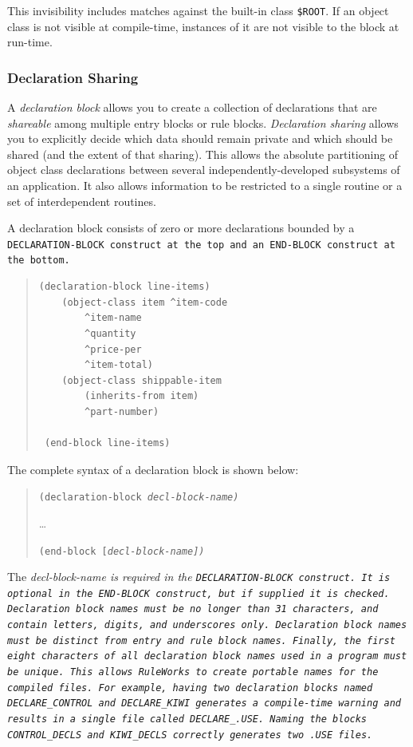This invisibility includes matches against the built-in class
\verb|$ROOT|. If an object class is not visible at compile-time,
instances of it are not visible to the block at run-time.

\subsubsection{Declaration Sharing}

A \emph{declaration block} allows you to create a collection of
declarations that are \emph{shareable} among multiple entry blocks or
rule blocks.  \emph{Declaration sharing} allows you to explicitly
decide which data should remain private and which should be shared
(and the extent of that sharing). This allows the absolute
partitioning of object class declarations between several
independently-developed subsystems of an application. It also allows
information to be restricted to a single routine or a set of
interdependent routines.

A declaration block consists of zero or more declarations bounded by a
\tt{DECLARATION-BLOCK} construct at the top and an \tt{END-BLOCK}
construct at the bottom.

\begin{quote}
\begin{verbatim}
(declaration-block line-items)
    (object-class item ^item-code
        ^item-name
        ^quantity
        ^price-per
        ^item-total)
    (object-class shippable-item
        (inherits-from item)
        ^part-number)

 (end-block line-items)
\end{verbatim}
\end{quote}

The complete syntax of a declaration block is shown below:
\begin{quote}
\verb|(|\tt{declaration-block} \it{decl-block-name}\verb|)|\par
{} \ldots\par
\verb|(|\tt{end-block} [\it{decl-block-name}]\verb|)|
\end{quote}
 
The \it{decl-block-name} is required in the \tt{DECLARATION-BLOCK}
construct. It is optional in the \tt{END-BLOCK} construct, but if
supplied it is checked. Declaration block names must be no longer than
31 characters, and contain letters, digits, and underscores only.
Declaration block names must be distinct from entry and rule block
names. Finally, the first eight characters of all declaration block
names used in a program must be unique. This allows RuleWorks to
create portable names for the compiled files. For example, having two
declaration blocks named \verb|DECLARE_CONTROL| and
\verb|DECLARE_KIWI| generates a compile-time warning and results in a
single file called \verb|DECLARE_.USE|. Naming the blocks
\verb|CONTROL_DECLS| and \verb|KIWI_DECLS| correctly generates two
\verb|.USE| files.

